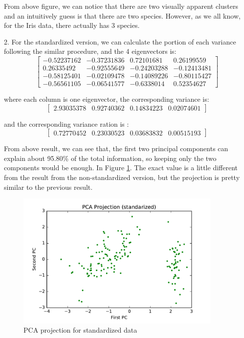 \begin{description}
From above figure, we can notice that there are two visually apparent clusters and an intuitively guess is that there are two species. However, as we all know, for the Iris data, there actually has 3 species.\\

\item{2. }
For the standardized version, we can calculate the portion of each variance following the similar procedure, and the 4 eigenvectors is:
$$
\begin{bmatrix}
 -0.52237162 & -0.37231836 &  0.72101681 &  0.26199559 \\
  0.26335492 & -0.92555649 & -0.24203288 & -0.12413481 \\
 -0.58125401 & -0.02109478 & -0.14089226 & -0.80115427 \\
 -0.56561105 & -0.06541577 & -0.6338014  &  0.52354627
\end{bmatrix}
$$ 

where each column is one eigenvector, the corresponding variance is:
$$\begin{bmatrix}
2.93035378 & 0.92740362 & 0.14834223 & 0.02074601
\end{bmatrix}$$

and the corresponding variance ration is :
$$\begin{bmatrix}
0.72770452 & 0.23030523 & 0.03683832 & 0.00515193
\end{bmatrix}$$

From above result, we can see that, the first two principal components can explain about 95.80\% of the total information, so keeping only the two components would be enough. In Figure \ref{fig:pca_2}. The exact value is a little different from the result from the non-standardized version, but the projection is pretty similar to the previous result.

\begin{figure}[H]
\centering
\includegraphics[width=0.9\textwidth]{./figures/projection2.pdf}
\caption{\label{fig:pca_2} PCA projection for standardized data}
\end{figure}

\end{description}

